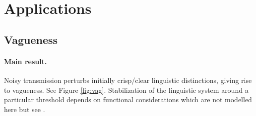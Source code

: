 \documentclass[10pt,a4paper]{article}
\begin{document}
\section{Applications}
\subsection{Vagueness}
\paragraph{Main result.} Noisy transmission perturbs initially crisp/clear linguistic distinctions, giving rise to vagueness. See Figure \ref{fig:vag}. Stabilization of the linguistic system around a  particular threshold depends on functional considerations which are not modelled here but see \citealt{franke+correia:toappear}.
\end{document}
